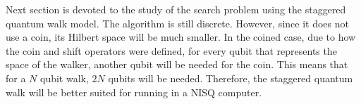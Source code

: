 \documentclass[../../dissertation.tex]{subfiles}
\begin{document}
Next section is devoted to the study of the search problem using the
staggered quantum walk model. The algorithm is still discrete. However, since it
does not use a coin, its Hilbert space will be much smaller. In the coined
case, due to how the coin and shift operators were defined, for every qubit
that represents the space of the walker, another qubit will be needed for the
coin. This means that for a $N$ qubit walk, $2N$ qubits will be needed.
Therefore, the staggered quantum walk will be better suited for running in a
NISQ computer.
\end{document}
